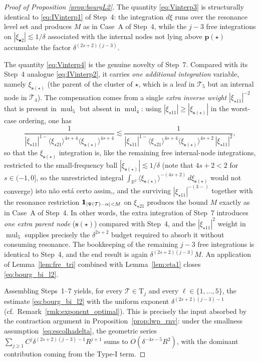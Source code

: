 \documentclass[a4paper,
11pt,  reqno]{amsart}
\newcommand{\mathbbm}[1]{\mathchoice%
    {\hbox{\sffamily 1\kern-.40em 1}}%
    {\hbox{\sffamily 1\kern-.40em 1}}%
    {\hbox{\scriptsize\sffamily 1\kern-.30em 1}}%
    {\hbox{\tiny\sffamily 1\kern-.25em 1}}}%
\newcommand{\blue}{\color{blue}}
\newcommand{\orange}{\color{orange}}
\newcommand{\jap}[1]{\langle #1 \rangle}
\newcommand{\5}{\textup{V}}
\newcommand{\ind}{\mathbbm 1}
\theoremstyle{remark}
\newcommand{\R}{\mathbb{R}}
\newcommand{\bul}{\bullet}
\newcommand{\TT}{\mathcal{T}}
\newcommand{\Tr}{\mathrm{T}}
\newcommand{\pb}{\mathbf{p}}
\newcommand{\sbf}{\mathbf{s}}
\DeclareMathOperator{\mul}{mul}
\numberwithin{equation}{section}
\numberwithin{theorem}{section}
\begin{document}
\begin{proof}[Proof of Proposition \ref{prop:bourgL2}]
The quantity \eqref{eq:Vinterp3} is structurally identical to \eqref{eq:IVinterp1} of Step~4: the integration $d\xi$ runs over the resonance level set and produces $M$ as in Case~A of Step~4, while the $j-3$ free integrations on $|\xi_{\bul 2}|\lesssim 1/\delta$ associated with the internal nodes not lying above $\pb(\star)$ accumulate the factor $\delta^{(2s+2)(j-3)}$.

The quantity \eqref{eq:Vinterp4} is the genuine novelty of Step~7. Compared with its Step~4 analogue \eqref{eq:IVinterp2}, it carries \emph{one additional integration} variable, namely $\xi_{\sbf(\star)}$ (the parent of the cluster of $\star$, which is a leaf in $\TT_5$ but an internal node in $\TT_4$). The compensation comes from a single \emph{extra inverse weight} $|\xi_{\star 1 1}|^{-2}$ that is present in $\mul_5$ but absent in $\mul_4$: using $|\xi_{\star 1 1}|\ge |\xi_{\sbf(\star)}|$ in the worst-case ordering, one has
$$
\frac{1}{|\xi_{\star 1 1}|^{1-}\jap{\xi_{\star 2 1}}^{4s+4}\jap{\xi_{\sbf(\star)}}^{4s+4}} \lesssim \frac{1}{|\xi_{\star 1 1}|^{1-}\jap{\xi_{\star 2 1}}^{4s+4}\jap{\xi_{\sbf(\star)}}^{4s+2}\,|\xi_{\star11}|^{2}},
$$
so that {\orange the $\xi_{\sbf(\star)}$ integration is, like the remaining free internal-node integrations, restricted to the small-frequency ball $|\xi_{\sbf(\star)}|\lesssim 1/\delta$ (note that $4s+2<2$ for $s\in(-1,0]$, so the unrestricted integral $\int_{\R^2}\jap{\xi_{\sbf(\star)}}^{-(4s+2)}\,d\xi_{\sbf(\star)}$ would not converge)} {\blue isto não está certo assim,}, and the surviving $|\xi_{\star 1 1}|^{-(3-)}$ together with the resonance restriction $\ind_{|\Psi(\TT)-\alpha|<M}$ on $\xi_{\star 2 1}$ produces the bound $M$ exactly as in Case~A of Step~4. In other words, the extra integration of Step~7 introduces \emph{one extra parent node} ($\sbf(\star)$) compared with Step~4, and the $|\xi_{\star11}|^{2}$ weight in $\mul_5$ supplies precisely the $\delta^{2s+2}$ budget required to absorb it without consuming resonance. The bookkeeping of the remaining $j-3$ free integrations is identical to Step~4, and the end result is again $\delta^{(2s+2)(j-3)}M$. An application of Lemma~\ref{lem:fre_tri} combined with Lemma~\ref{lem:eta1} closes \eqref{eq:bourg_bi_l2}.

\medskip

Assembling Steps~1--7 yields, for every $\TT\in\Tr_j$ and every $\ell\in\{1,\dots,5\}$, the estimate \eqref{eq:bourg_bi_l2} with the uniform exponent $\delta^{(2s+2)(j-3)-1}$ (cf.\ Remark~\ref{rmk:exponent_optimal}). This is precisely the input absorbed by the contraction argument in Proposition~\ref{prop:lwp_rnv}: under the smallness assumption~\eqref{eq:escolhadelta}, the geometric series $\sum_{j\ge 1} C^j \delta^{(2s+2)(j-3)-1} R^{j+1}$ sums to $O(\delta^{-4s-5}R^2)$, with the dominant contribution coming from the Type-I term.
\end{proof}
\end{document}
